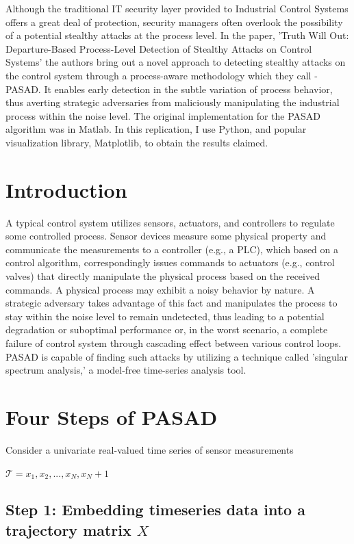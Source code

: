 Although the traditional IT security layer provided to Industrial Control Systems offers a great deal of protection, security managers often overlook the possibility of a potential stealthy attacks at the process level. In the paper\supercite{Pasad:2018}, 'Truth Will Out: Departure-Based Process-Level Detection of Stealthy Attacks on Control Systems' the authors bring out a novel approach to detecting stealthy attacks on the control system through a process-aware methodology which they call - PASAD. It enables early detection in the subtle variation of process behavior, thus averting strategic adversaries from maliciously manipulating the industrial process within the noise level. The original implementation for the PASAD algorithm was in Matlab. In this replication, I use Python, and popular visualization library, Matplotlib, to obtain the results claimed.

\section*{Introduction}

A typical control system utilizes sensors, actuators, and controllers to regulate some controlled process. Sensor devices measure some physical property and communicate the measurements to a controller (e.g., a PLC), which based on a control algorithm, correspondingly issues commands to actuators
(e.g., control valves) that directly manipulate the physical process based on the received commands. A physical process may exhibit a noisy behavior by nature. A strategic adversary takes advantage of this fact and manipulates the process to stay within the noise level to remain undetected, thus leading to a potential degradation or suboptimal performance or, in the worst scenario, a complete failure of control system through cascading effect between various control loops. PASAD is capable of finding such attacks by utilizing a technique called 'singular spectrum analysis,' a model-free time-series analysis tool.

\section*{Four Steps of PASAD}
Consider a univariate real-valued time series of sensor measurements

\begin{center}
$\mathcal{T}=x_1, x_2,...,x_N, x_N+1$
\end{center}

\subsection*{Step 1: Embedding timeseries data into a trajectory matrix $X$}

